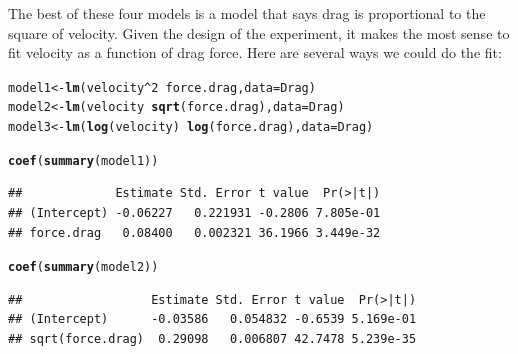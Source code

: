 \documentclass[twoside]{book}\usepackage[]{graphicx}\usepackage[]{xcolor}
\makeatletter
\newcommand{\hlnum}[1]{\textcolor[rgb]{0.686,0.059,0.569}{#1}}%
\newcommand{\hlopt}[1]{\textcolor[rgb]{0,0,0}{#1}}%
\newcommand{\hlstd}[1]{\textcolor[rgb]{0.345,0.345,0.345}{#1}}%
\newcommand{\hlkwb}[1]{\textcolor[rgb]{0.69,0.353,0.396}{#1}}%
\newcommand{\hlkwc}[1]{\textcolor[rgb]{0.333,0.667,0.333}{#1}}%
\newcommand{\hlkwd}[1]{\textcolor[rgb]{0.737,0.353,0.396}{\textbf{#1}}}%
\newenvironment{kframe}{%
 \def\at@end@of@kframe{}%
 \ifinner\ifhmode%
  \def\at@end@of@kframe{\end{minipage}}%
  \begin{minipage}{\columnwidth}%
 \fi\fi%
 \def\FrameCommand##1{\hskip\@totalleftmargin \hskip-\fboxsep
 \colorbox{shadecolor}{##1}\hskip-\fboxsep
     \hskip-\linewidth \hskip-\@totalleftmargin \hskip\columnwidth}%
 \MakeFramed {\advance\hsize-\width
   \@totalleftmargin\z@ \linewidth\hsize
   \@setminipage}}%
 {\par\unskip\endMakeFramed%
 \at@end@of@kframe}
\newenvironment{knitrout}{}{} %
\makeatother
\begin{document}
\begin{solution}
The best of these four models is a model that says drag is proportional
to the square of velocity.
Given the design of the experiment, it makes the most sense to fit
velocity as a function of drag force.  Here are several ways we could 
do the fit:
\begin{knitrout}
\color{fgcolor}\begin{kframe}
\begin{alltt}
\hlstd{model1} \hlkwb{<-} \hlkwd{lm}\hlstd{(velocity}\hlopt{^}\hlnum{2} \hlopt{~} \hlstd{force.drag,} \hlkwc{data} \hlstd{= Drag)}
\hlstd{model2} \hlkwb{<-} \hlkwd{lm}\hlstd{(velocity} \hlopt{~} \hlkwd{sqrt}\hlstd{(force.drag),} \hlkwc{data} \hlstd{= Drag)}
\hlstd{model3} \hlkwb{<-} \hlkwd{lm}\hlstd{(}\hlkwd{log}\hlstd{(velocity)} \hlopt{~} \hlkwd{log}\hlstd{(force.drag),} \hlkwc{data} \hlstd{= Drag)}
\end{alltt}
\end{kframe}
\end{knitrout}
\begin{knitrout}
\color{fgcolor}\begin{kframe}
\begin{alltt}
\hlkwd{coef}\hlstd{(}\hlkwd{summary}\hlstd{(model1))}
\end{alltt}
\begin{verbatim}
##             Estimate Std. Error t value  Pr(>|t|)
## (Intercept) -0.06227   0.221931 -0.2806 7.805e-01
## force.drag   0.08400   0.002321 36.1966 3.449e-32
\end{verbatim}
\end{kframe}
\end{knitrout}
\begin{knitrout}
\color{fgcolor}\begin{kframe}
\begin{alltt}
\hlkwd{coef}\hlstd{(}\hlkwd{summary}\hlstd{(model2))}
\end{alltt}
\begin{verbatim}
##                  Estimate Std. Error t value  Pr(>|t|)
## (Intercept)      -0.03586   0.054832 -0.6539 5.169e-01
## sqrt(force.drag)  0.29098   0.006807 42.7478 5.239e-35
\end{verbatim}
\end{kframe}
\end{knitrout}
\begin{knitrout}

\end{knitrout}
\end{solution}
\end{document}
